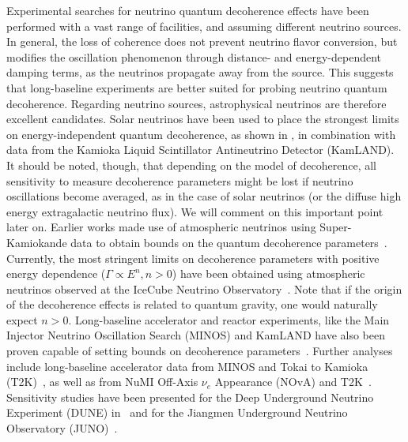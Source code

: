 \documentclass[aps, prd, onecolumn, tightenlines, notitlepage, superscriptaddress, nofootinbib, preprintnumbers, floatfix,showkeys,11pt]{revtex4-2}
\begin{document}
Experimental searches for neutrino quantum decoherence effects have been performed with a vast range of facilities, and assuming different neutrino sources.  In general, the loss of coherence does not prevent neutrino flavor conversion, but modifies the oscillation phenomenon through distance- and energy-dependent damping terms, as the neutrinos propagate away from the source. This suggests that long-baseline experiments are better suited for probing neutrino quantum decoherence. 
%
Regarding neutrino sources, astrophysical neutrinos are therefore excellent candidates. Solar neutrinos have been used to place the strongest limits on energy-independent quantum decoherence, as shown in \cite{Fogli:2007tx,deHolanda:2019tuf}, in combination with data from the Kamioka Liquid Scintillator Antineutrino Detector (KamLAND). It should be noted, though, that depending on the model of decoherence, all sensitivity to measure decoherence parameters might be lost if neutrino oscillations become averaged, as in the case of solar neutrinos (or the diffuse high energy extragalactic neutrino flux). We will comment on this important point later on.
%
Earlier works made use of atmospheric neutrinos using Super-Kamiokande data to obtain bounds on the quantum decoherence parameters~\cite{Lisi:2000zt}. Currently, the most stringent limits on decoherence parameters with positive energy dependence ($\Gamma\propto E^{n}, n>0$) have been obtained using atmospheric neutrinos observed at the IceCube Neutrino Observatory~\cite{Coloma:2018idr}. Note that if the origin of the decoherence effects is related to quantum gravity, one would naturally expect $n>0$.
%
Long-baseline accelerator and reactor experiments, like the Main Injector Neutrino Oscillation Search (MINOS) and KamLAND have also been proven capable of setting bounds on decoherence parameters~\cite{deOliveira:2013dia,BalieiroGomes:2016ykp}. Further analyses include long-baseline accelerator data from MINOS and Tokai to Kamioka (T2K)~\cite{Gomes:2020muc}, as well as
from NuMI Off-Axis $\nu_e$ Appearance (NOvA) and T2K~\cite{Coelho:2017zes}. Sensitivity studies have been presented for the Deep Underground Neutrino Experiment (DUNE) in~\cite{BalieiroGomes:2018gtd,Carpio:2018gum} and for the Jiangmen Underground Neutrino Observatory (JUNO)~\cite{JUNO:2021ydg}.
\end{document}

